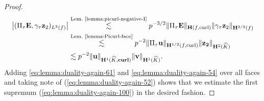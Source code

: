 \documentclass{article}
\begin{document}
\begin{proof}
\begin{align}
\label{eq:lemma:duality-again-54} 
\left| (\Pi_\tau\mathbf{E},\gamma_\tau\mathbf{z}_2)_{L^2(f)}\right|
&\stackrel{\text{Lem.~\ref{lemma:picurl-negative-I}}}{\lesssim} p^{-3/2} \Vert\Pi_\tau\mathbf{E}\Vert_{\mathbf{H}(f,\operatorname{curl})} \Vert\gamma_\tau\mathbf{z}_2\Vert_{\mathbf{H}^{3/2}(f)}\\
\nonumber 
&\stackrel{\text{Lem.~\ref{lemma:Picurl-face}}}{\lesssim} p^{-2}\Vert\Pi_\tau\mathbf{u}\Vert_{\mathbf{H}^{1/2}(f,\operatorname{curl})} \Vert\mathbf{z_2}\Vert_{\mathbf{H}^2(\widehat{K})} \\
\nonumber 
& \lesssim p^{-2} \Vert\mathbf{u}\Vert_{\mathbf{H}^1(\widehat{K},\operatorname{\mathbf{curl}})} \Vert\mathbf{v}\Vert_{\mathbf{H}^1(\widehat{K})}.
\end{align}
Adding \eqref{eq:lemma:duality-again-61} and \eqref{eq:lemma:duality-again-54} over all faces 
and taking note of (\ref{eq:lemma:duality-again-52}) shows that we estimate the first supremum 
(\ref{eq:lemma:duality-again-100}) in the desired fashion. 


\end{proof}
\end{document}
